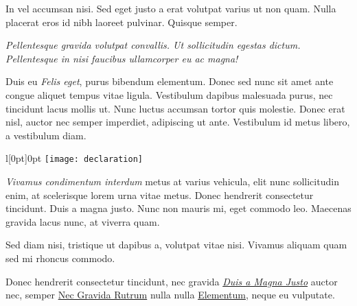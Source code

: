 \documentclass[10pt]{article} %
\begin{document}
\begin{minipage}[t]{.66\linewidth} %

\hypertarget{firstnews}{} %

In vel accumsan nisi. Sed eget justo a erat volutpat varius ut non quam. Nulla placerat eros id nibh laoreet pulvinar. Quisque semper.

\begin{center}
\parbox[t]{.70\linewidth}{\textsl{Pellentesque gravida volutpat convallis. Ut sollicitudin egestas dictum. Pellentesque in nisi faucibus ullamcorper eu ac magna!}}
\end{center}

Duis eu \textsl{Felis eget}, purus bibendum elementum. Donec sed nunc sit amet ante congue aliquet tempus vitae ligula. Vestibulum dapibus malesuada purus, nec tincidunt lacus mollis ut. Nunc luctus accumsan tortor quis molestie. Donec erat nisl, auctor nec semper imperdiet, adipiscing ut ante. Vestibulum id metus libero, a vestibulum diam. 

\begin{wrapfigure}[7]{l}[0pt]{0pt} %
\texttt{[image: declaration]}
\end{wrapfigure}

\textsl{Vivamus condimentum interdum} metus at varius vehicula, elit nunc sollicitudin enim, at scelerisque lorem urna vitae metus. Donec hendrerit consectetur tincidunt. Duis a magna justo. Nunc non mauris mi, eget commodo leo. Maecenas gravida lacus nunc, at viverra quam. %

Sed diam nisi, tristique ut dapibus a, volutpat vitae nisi. Vivamus aliquam quam sed mi rhoncus commodo. 

Donec hendrerit consectetur tincidunt, nec gravida \href{http://www.example.com}{\textit{Duis a Magna Justo}} auctor nec, semper \href{http://www.example.com/}{Nec Gravida Rutrum} nulla nulla \href{http://www.example.com}{Elementum}, neque eu vulputate.


\hypertarget{secondnews}{} %


\end{minipage}
\end{document}
